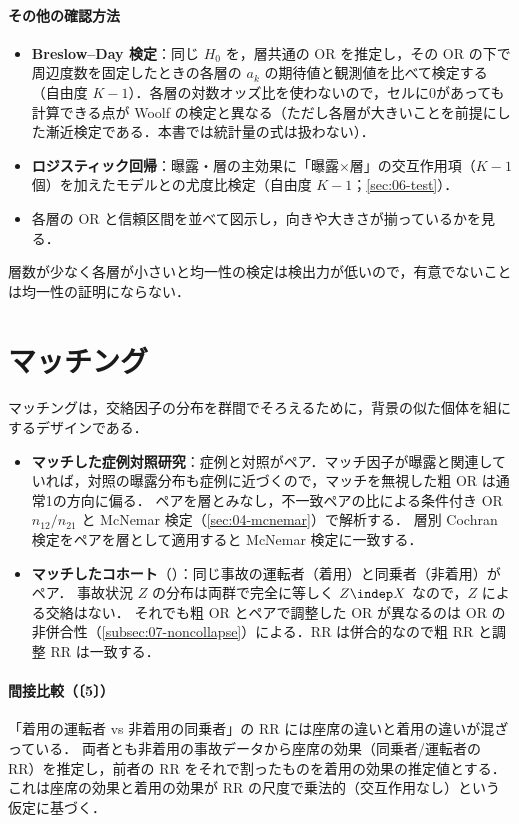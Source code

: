\paragraph{その他の確認方法}
\begin{itemize}
\item \textbf{Breslow--Day 検定}：同じ $H_0$ を，層共通の OR を推定し，その OR の下で周辺度数を固定したときの各層の $a_k$ の期待値と観測値を比べて検定する（自由度 $K-1$）．各層の対数オッズ比を使わないので，セルに0があっても計算できる点が Woolf の検定と異なる（ただし各層が大きいことを前提にした漸近検定である．本書では統計量の式は扱わない）．
\item \textbf{ロジスティック回帰}：曝露・層の主効果に「曝露×層」の交互作用項（$K-1$ 個）を加えたモデルとの尤度比検定（自由度 $K-1$；\cref{sec:06-test}）．
\item 各層の OR と信頼区間を並べて図示し，向きや大きさが揃っているかを見る．
\end{itemize}
\Youchui 層数が少なく各層が小さいと均一性の検定は検出力が低いので，有意でないことは均一性の証明にならない．

\section{マッチング}\label{sec:07-match}
\Hinshutsu マッチングは，交絡因子の分布を群間でそろえるために，背景の似た個体を組にするデザインである．
\begin{itemize}
\item \textbf{マッチした症例対照研究}：症例と対照がペア．マッチ因子が曝露と関連していれば，対照の曝露分布も症例に近づくので，マッチを無視した粗 OR は通常1の方向に偏る．
      ペアを層とみなし，不一致ペアの比による条件付き OR $n_{12}/n_{21}$ と McNemar 検定（\cref{sec:04-mcnemar}）で解析する．
      層別 Cochran 検定をペアを層として適用すると McNemar 検定に一致する．
\item \textbf{マッチしたコホート}（）：同じ事故の運転者（着用）と同乗者（非着用）がペア．
      事故状況 $Z$ の分布は両群で完全に等しく $Z\indep X$ なので，$Z$ による交絡はない．
      それでも粗 OR とペアで調整した OR が異なるのは OR の非併合性（\cref{subsec:07-noncollapse}）による．RR は併合的なので粗 RR と調整 RR は一致する．
\end{itemize}
\paragraph{間接比較（〔5〕）}
「着用の運転者 vs 非着用の同乗者」の RR には座席の違いと着用の違いが混ざっている．
両者とも非着用の事故データから座席の効果（同乗者/運転者の RR）を推定し，前者の RR をそれで割ったものを着用の効果の推定値とする．
これは座席の効果と着用の効果が RR の尺度で乗法的（交互作用なし）という仮定に基づく．

